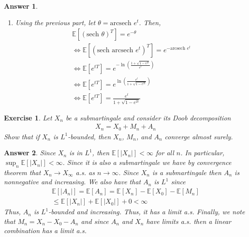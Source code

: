 \documentclass[12pt]{article}
\theoremstyle{colon}
\newtheorem{exercise}{Exercise}
\newtheorem*{answer}{Answer}
\begin{document}
\begin{answer}
\begin{enumerate}[label=\alph*)]
\begin{gather*}
        \mathbb{E}[M_T] = 1 \\
        \Longleftrightarrow \mathbb{E}[(\text{sech } \theta)^T e^{\theta S_T}] = 1 \\
        \Longleftrightarrow \mathbb{E}[(\text{sech } \theta)^T e^{\theta \cdot 1}] = 1 \\
        \Longleftrightarrow e^\theta \mathbb{E}[(\text{sech } \theta)^T] = 1 \\
        \Longleftrightarrow \mathbb{E}[(\text{sech } \theta)^T] = e^{-\theta}
      \end{gather*}
    \item Using the previous part, let $\theta = \text{arcsech } e^t$. Then,
      \begin{gather*}
        \mathbb{E}[(\text{sech } \theta)^T] = e^{-\theta} \\
        \Longleftrightarrow \mathbb{E}[(\text{sech } \text{arcsech } e^t)^T] = e^{-\text{arcsech } e^t} \\
        \Longleftrightarrow \mathbb{E}[e^{t T}] = e^{- \ln \left( \frac{1 + \sqrt{1 - e^{2t}}}{e^t} \right) } \\
        \Longleftrightarrow \mathbb{E}[e^{t T}] = e^{\ln \left( \frac{e^t}{1 + \sqrt{1 - e^{2t}}} \right) } \\
        \Longleftrightarrow \mathbb{E}[e^{t T}] = \frac{e^t}{1 + \sqrt{1 - e^{2t}}}
      \end{gather*}
  \end{enumerate}
\end{answer}

\clearpage

\begin{exercise}
  Let $X_n$ be a submartingale and consider its Doob decomposition
  \begin{gather*}
    X_n = X_0 + M_n + A_n
  \end{gather*}
  Show that if $X_n$ is $L^1$-bounded, then $X_n$, $M_n$, and $A_n$ converge almost surely.
\end{exercise}

\begin{answer}
  Since $X_n$ is in $L^1$, then $\mathbb{E}[\lvert X_n \rvert] < \infty$ for all $n$. In particular, $\sup_n \mathbb{E}[\lvert X_n \rvert] < \infty$. Since it is also a submartingale we have by convergence theorem that $X_n \rightarrow X_\infty$ a.s. as $n \rightarrow \infty$. Since $X_n$ is a submartingale then $A_n$ is nonnegative and increasing. We also have that $A_n$ is $L^1$ since
  \begin{gather*}
    \mathbb{E}[\lvert A_n \rvert] = \mathbb{E}[A_n] = \mathbb{E}[X_n] - \mathbb{E}[X_0] - \mathbb{E}[M_n] \\
    \leq \mathbb{E}[\lvert X_n \rvert] + \mathbb{E}[\lvert X_0 \rvert] + 0 < \infty
  \end{gather*}
  Thus, $A_n$ is $L^1$-bounded and increasing. Thus, it has a limit a.s. Finally, we note that $M_n = X_n - X_0 - A_n$ and since $A_n$ and $X_n$ have limits a.s. then a linear combination has a limit a.s.
\end{answer}
\end{document}
